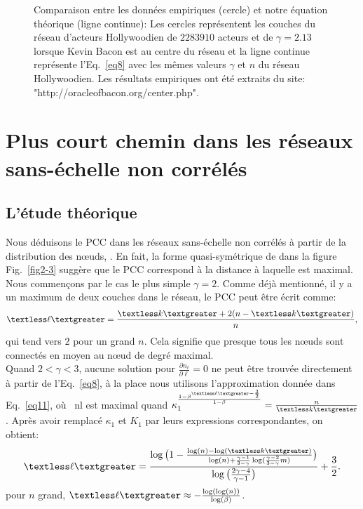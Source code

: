 \begin{figure}[h!]
	\caption{Comparaison entre les données empiriques (cercle) et notre équation théorique (ligne continue): Les cercles représentent les couches du réseau d’acteurs Hollywoodien de $2283910$ acteurs et de $\gamma=2.13$ lorsque Kevin Bacon est au centre du réseau et la ligne continue représente l'Eq.~\eqref{eq8} avec les mêmes valeurs $\gamma$ et $n$ du réseau Hollywoodien. Les résultats empiriques ont été extraits du site: "http://oracleofbacon.org/center.php".}	
	\label{couch-reel}
\end{figure}
    
\section{Plus court chemin dans les réseaux sans-échelle non corrélés }
   \subsection{L'étude théorique}
   \label{pcc}
   Nous déduisons le PCC dans les réseaux sans-échelle non corrélés à partir de la distribution des nœuds, \nl. En fait, la forme quasi-symétrique de \nl dans la figure Fig.~\ref{fig2-3} suggère que le PCC correspond à la distance à laquelle \nl est maximal. \\ Nous commençons par le cas le plus simple $\gamma=2$. Comme déjà mentionné, il y a un maximum de deux couches dans le réseau, le PCC peut être écrit comme:
   \begin{align}
   	\textless \ell \textgreater=\frac{\km+2(n-\km)}{n},
   	\label{eq14}  
   \end{align}
qui tend vers $2$ pour un grand $n$. Cela signifie que presque tous les nœuds sont connectés en moyen au nœud de degré maximal. \\
Quand $ 2<\gamma<3 $, aucune solution pour $\frac{\partial n_{\ell}}{\partial\ell}=0$ ne peut être trouvée directement à partir de l'Eq.~\eqref{eq8}, à la place nous utilisons l'approximation donnée dans Eq.~\eqref{eq11}, où \ nl est maximal quand $\kappa_1^{\frac{1-\beta^{\textless \ell \textgreater-\frac{3}{2}}}{1-\beta}}=\frac{n}{\km}$. Après avoir remplacé $\kappa_1 $ et $K_1$ par leurs expressions correspondantes, on obtient:
\begin{align}
	\textless \ell \textgreater=\frac{\log\big(1-\frac{\log(n)-\log(\km)}{\log(n)+\frac{\gamma-1}{3-\gamma}\log(\frac{\gamma-2}{3-\gamma}m)}\big)}{\log\big(\frac{2\gamma-4}{\gamma-1}\big)}+\frac{3}{2}.
	\label{eq12}
\end{align}
pour $n$ grand, $\textless \ell \textgreater \approx -\frac{\log(\log(n))}{\log(\beta)}$.
